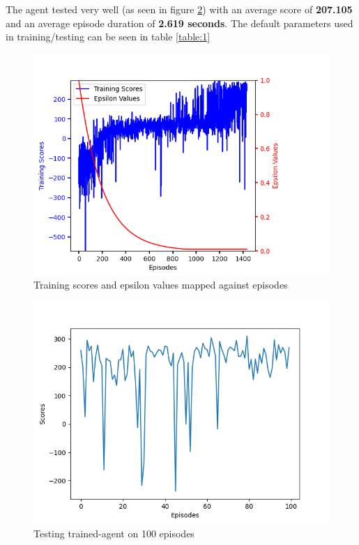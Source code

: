 \documentclass[conference]{IEEEtran}
\begin{document}
The agent tested very well (as seen in figure \ref{fig:agent-test}) with an average score of \textbf{207.105} and an average episode duration of \textbf{2.619 seconds}. The default parameters used in training/testing can be seen in table \ref{table:1}

\begin{figure}[]
    \centering
    \includegraphics[scale=0.45]{figs/agent-training}
    \caption{Training scores and epsilon values mapped against episodes}
    \label{fig:agent-training}
\end{figure}

\begin{figure}[]
    \centering
    \includegraphics[scale=0.45]{figs/agent-test}
    \caption{Testing trained-agent on 100 episodes}
    \label{fig:agent-test}
\end{figure}
\end{document}
